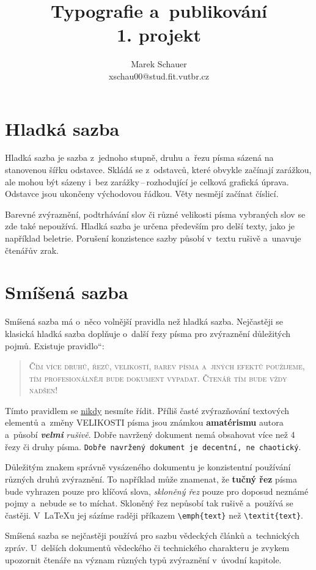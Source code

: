 \documentclass[a4paper, twocolumn, 11pt]{article}
\title{Typografie a~publikování\\1. projekt}
\author{Marek Schauer\\ 
xschau00@stud.fit.vutbr.cz}
\date{}   %
\newcommand{\myuv}[1]{\quotedblbase #1\textquotedblleft}
\begin{document}
\maketitle
\section{Hladká sazba}
Hladká sazba je sazba z~jednoho stupně, druhu a~řezu písma sázená na stanovenou šířku odstavce. Skládá se z~odstavců, které obvykle začínají zarážkou, ale mohou být sázeny i~bez zarážky\,--\,rozhodující je celková grafická úprava. Odstavce jsou ukončeny východovou řádkou. Věty nesmějí začínat číslicí.


Barevné zvýraznění, podtrhávání slov či různé velikosti písma vybraných slov se zde také nepoužívá. Hladká sazba je určena především pro delší texty, jako je například beletrie. Porušení konzistence sazby působí v~textu rušivě a~unavuje čtenářův zrak.
\section{Smíšená sazba}
Smíšená sazba má o~něco volnější pravidla než hladká sazba. Nejčastěji se klasická hladká sazba doplňuje o~další řezy písma pro zvýraznění důležitých pojmů. Existuje \myuv{pravidlo}:
\begin{quotation}
\textsc{Čím více druhů, řezů, velikostí, barev písma a~jiných efektů po\-uži\-je\-me, tím profesionálněji bude do\-ku\-ment vypadat. Čtenář tím bude vždy nadšen!}
\end{quotation}


Tímto pravidlem se \underline{nikdy} nesmíte řídit. Příliš časté zvýrazňování textových elementů a~změny {\huge V}{\LARGE E}{\Large L}{\large I}{\normalsize K}{\small O}{\footnotesize S}{\scriptsize T}{\tiny I} písma {\Large jsou} {\LARGE známkou} {\huge \textbf{a\-ma\-té\-ri\-smu}} autora a~působí \emph{\textbf{velmi}} \emph{rušivě}. Dobře navržený dokument nemá obsahovat více než 4 řezy či druhy písma. \texttt{Dobře navržený dokument je decentní, ne chaotický}.


Důležitým znakem správně vysázeného dokumentu je konzistentní používání různých druhů zvýraznění. To například může znamenat, že \textbf{tučný řez} písma bude vyhrazen pouze pro klíčová slova, \emph{skloněný řez} pouze pro doposud neznámé pojmy a~nebude se to míchat. Skloněný řez nepůsobí tak rušivě a~používá se častěji. V~\LaTeX u jej sázíme raději příkazem \verb|\emph{text}| než \verb|\textit{text}|.


Smíšená sazba se nejčastěji používá pro sazbu vě\-de\-ckých článků a~technických zpráv. U~delších dokumentů vědeckého či technického charakteru je zvykem upozornit čtenáře na význam různých typů zvý\-raz\-ně\-ní v~úvodní kapitole.
\end{document}
